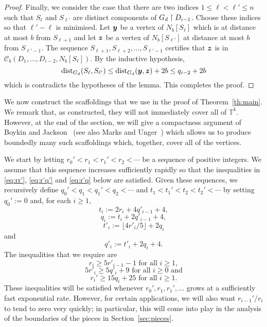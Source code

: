 \documentclass[12pt,a4paper]{amsart}
\numberwithin{equation}{section}
\theoremstyle{definition}
\begin{document}
\begin{proof}
Finally, we consider the case that there are two indices $1\leq \ell < \ell'\leq n$ such that $S_{\ell}$ and $S_{\ell'}$ are distinct components of $G_d\upharpoonright D_{i-1}$. Choose these indices so that $\ell'-\ell$ is minimised. Let $\boldsymbol{y}$ be a vertex of $N_b[S_{\ell}]$ which is at distance at most $b$ from $S_{\ell+1}$ and let $\boldsymbol{z}$ be a vertex of $N_b[S_{\ell'}]$ at distance at most $b$ from $S_{\ell'-1}$. The sequence $S_{\ell+1},S_{\ell+2},\dots,S_{\ell'-1}$ certifies that $\boldsymbol{z}$ is in $\mathcal{C}_b(D_1,\dots,D_{i-2},N_b[S_{\ell}])$. By the inductive hypothesis, 
\[\operatorname{dist}_{G_d}(S_{\ell},S_{\ell'})\leq \operatorname{dist}_{G_d}(\boldsymbol{y},\boldsymbol{z})+2b\leq q_{i-2}+2b\]
which is contradicts the hypotheses of the lemma. This completes the proof.
\end{proof}

We now construct the scaffoldings that we use in the proof of Theorem~\ref{th:main}. We remark that, as constructed, they will not immediately cover all of $\mathbb{T}^k$. However, at the end of the section, we will give a compactness argument of Boykin and Jackson~\cite{BoykinJackson07} (see also Marks and Unger~\cite[Lemma~A.2]{MarksUnger17}) which allows us to produce boundedly many such scaffoldings which, together, cover all of the vertices. 

We start by letting $r_0'<r_1<r_1'<r_2<\cdots$ be a sequence of positive integers. We assume that this sequence increases sufficiently rapidly so that the inequalities in \eqref{eq:rr'}, \eqref{eq:r'q'} and \eqref{eq:r'q} below are satisfied. Given these sequences, we recursively define $q_0'<q_1<q_1'<q_2<\cdots$ and $t_1<t_1'<t_2<t_2'<\cdots$ by setting $q_0':=0$ and, for each $i\geq1$,
\[t_i:=2r_i+4q'_{i-1}+4,\]
\[q_i:=t_i+2q'_{i-1}+4,\]
\[t'_i:=\lfloor 4r'_i/5\rfloor + 2q_i\]
and
\[q'_i:=t'_i+2q_i+4.\]
The inequalities that we require are
\begin{equation}
\label{eq:rr'}
r_i\geq 5r'_{i-1}-1\text{ for all }i\geq1,
\end{equation}
\begin{equation}
\label{eq:r'q'}
5r'_i\geq 5q'_{i}+9\text{ for all }i\geq0 \text{ and} 
\end{equation}
\begin{equation}
\label{eq:r'q}
r_i'\geq 15q_i+25\text{ for all }i\geq1.
\end{equation}
These inequalities will be satisfied whenever $r_0',r_1,r_1',\dots$ grows at a sufficiently fast exponential rate. However, for certain applications, we will also want $r_{i-1}'/r_i$ to tend to zero very quickly; in particular, this will come into play in the analysis of the boundaries of the pieces in Section~\ref{sec:pieces}. 
\end{document}
